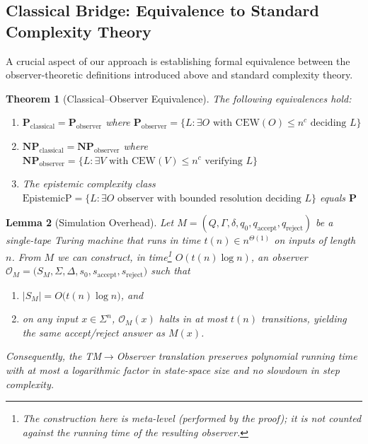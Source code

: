 \documentclass[12pt]{article}
\newcommand{\accept}{\mathrm{accept}}
\newcommand{\reject}{\mathrm{reject}}
\newtheorem{theorem}{Theorem}
\newtheorem{lemma}[theorem]{Lemma}
\theoremstyle{definition}
\theoremstyle{definition}
\theoremstyle{remark}
\theoremstyle{remark}
\begin{document}
\subsection{Classical Bridge: Equivalence to Standard Complexity Theory}
\label{sec:classical-bridge}

A crucial aspect of our approach is establishing formal equivalence between the observer-theoretic definitions introduced above and standard complexity theory.

\begin{theorem}[Classical--Observer Equivalence]
\label{thm:classical-observer-equiv}
The following equivalences hold:
\begin{enumerate}
\item $\mathbf{P}_{\text{classical}} = \mathbf{P}_{\text{observer}}$ where $\mathbf{P}_{\text{observer}} = \{L : \exists O \text{ with } \mathrm{CEW}(O) \leq n^c \text{ deciding } L\}$
\item $\mathbf{NP}_{\text{classical}} = \mathbf{NP}_{\text{observer}}$ where $\mathbf{NP}_{\text{observer}} = \{L : \exists V \text{ with } \mathrm{CEW}(V) \leq n^c \text{ verifying } L\}$
\item The epistemic complexity class $\text{EpistemicP} = \{L : \exists O \text{ observer with bounded resolution deciding } L\}$ equals $\mathbf{P}$
\end{enumerate}
\end{theorem}

\begin{lemma}[Simulation Overhead]\label{lem:simulation-overhead}
Let $M=(Q,\Gamma,\delta,q_0,q_{\accept},q_{\reject})$ be a single-tape
Turing machine that runs in time $t(n)\in n^{\Theta(1)}$ on inputs
of length $n$.
From $M$ we can construct, in time\footnote{%
The construction here is meta-level (performed by the proof); it is
\emph{not} counted against the running time of the resulting observer.}
$O(t(n)\log n)$, an \emph{observer}
$\mathcal O_M=\bigl(S_M,\Sigma,\Delta,s_0,s_{\accept},s_{\reject}\bigr)$
such that

\begin{enumerate}[label=(\roman*)]
  \item $|S_M| = O\!\bigl(t(n)\log n\bigr)$, and
  \item on any input $x\in\Sigma^n$, $\mathcal O_M(x)$ halts in
        at most $t(n)$ transitions, yielding the same accept/reject
        answer as $M(x)$.
\end{enumerate}

Consequently, the TM$\!\to\!$Observer translation preserves \emph{polynomial}
running time with at most a logarithmic factor in state-space size
and no slowdown in step complexity.
\end{lemma}
\end{document}

